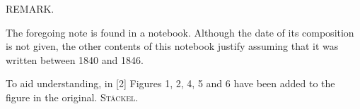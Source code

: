%
\begin{center}
REMARK.
\end{center}

The foregoing note is found in a notebook. Although the date of its composition is not given, the other contents of this notebook justify assuming that it was written between 1840 and 1846.

To aid understanding, in [2] Figures 1, 2, 4, 5 and 6 have been added to the figure in the original. \hfill\textsc{Stäckel}.
